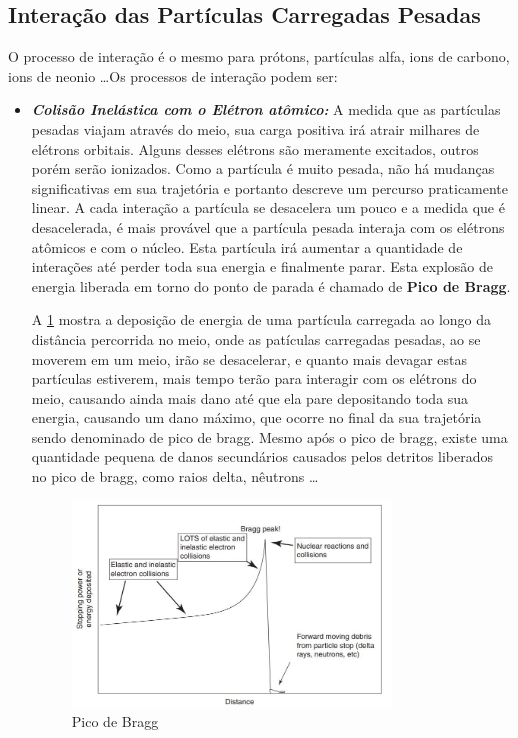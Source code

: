 \documentclass[11pt,a4paper]{article}
\begin{document}
        \subsection{Interação das Partículas Carregadas Pesadas}

            O processo de interação é o mesmo para prótons, partículas alfa, ions de carbono, ions de neonio \dots Os processos de interação podem ser:

            \begin{itemize}
                \item \textbf{\textit{\textcolor{CarnationPink}{Colisão Inelástica com o Elétron atômico}:}} A medida que as partículas pesadas viajam através do meio, sua carga positiva irá atrair milhares de elétrons orbitais. Alguns desses elétrons são meramente excitados, outros porém serão ionizados. Como a partícula é muito pesada, não há mudanças significativas em sua trajetória e portanto descreve um percurso praticamente linear. A cada interação a partícula se desacelera um pouco e a medida que é desacelerada, é mais provável que a partícula pesada interaja com os elétrons atômicos e com o núcleo. Esta partícula irá aumentar a quantidade de interações até perder toda sua energia e finalmente parar. Esta explosão de energia liberada em torno do ponto de parada é chamado de \textbf{\textcolor{CarnationPink}{Pico de Bragg}}.
                
                A \ref{fig:picodeBragg} mostra a deposição de energia de uma partícula carregada ao longo da distância percorrida no meio, onde as patículas carregadas pesadas, ao se moverem em um meio, irão se desacelerar, e quanto mais devagar estas partículas estiverem, mais tempo terão para interagir com os elétrons do meio, causando ainda mais dano até que ela pare depositando toda sua energia, causando um dano máximo, que ocorre no final da sua trajetória sendo denominado de pico de bragg. Mesmo após o pico de bragg, existe uma quantidade pequena de danos secundários causados pelos detritos liberados no pico de bragg, como raios delta, nêutrons \dots
                
                \begin{figure}[h]
                    \centering
                    \includegraphics[width=0.8\textwidth]{Imagens/picodeBragg.JPG}
                    \caption{Pico de Bragg}
                    \label{fig:picodeBragg}                
                \end{figure}
                


\end{itemize}
\end{document}
